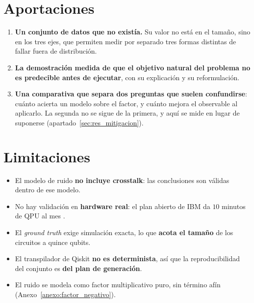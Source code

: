 \section{Aportaciones}
\label{sec:aportaciones}

\begin{enumerate}
    \item \textbf{Un conjunto de datos que no existía.} Su valor no está en el tamaño, sino en
          los tres ejes, que permiten medir por separado tres formas distintas de fallar fuera
          de distribución.

    \item \textbf{La demostración medida de que el objetivo natural del problema no es
          predecible antes de ejecutar}, con su explicación y su reformulación.

    \item \textbf{Una comparativa que separa dos preguntas que suelen confundirse}: cuánto
          acierta un modelo sobre el factor, y cuánto mejora el observable al aplicarlo. La
          segunda no se sigue de la primera, y aquí se mide en lugar de suponerse
          (apartado~\ref{sec:res_mitigacion}).
\end{enumerate}

\section{Limitaciones}
\label{sec:limitaciones_finales}

\begin{itemize}
    \item El modelo de ruido \textbf{no incluye crosstalk}: las conclusiones son válidas dentro
          de ese modelo.
    \item No hay validación en \textbf{hardware real}: el plan abierto de IBM da $10$ minutos
          de QPU al mes \cite{ibm2026productos}.
    \item El \textit{ground truth} exige simulación exacta, lo que \textbf{acota el tamaño} de
          los circuitos a quince qubits.
    \item El transpilador de Qiskit \textbf{no es determinista}, así que la reproducibilidad
          del conjunto es \textbf{del plan de generación}.
    \item El ruido se modela como factor multiplicativo puro, sin término afín
          (Anexo~\ref{anexo:factor_negativo}).
\end{itemize}


